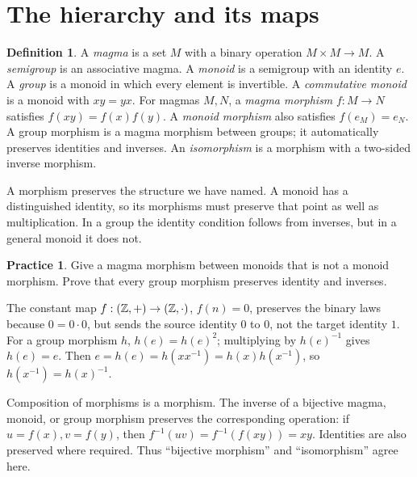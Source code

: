 \documentclass[11pt,openany]{book}
\theoremstyle{definition}
\newtheorem{definition}[theorem]{Definition}
\newtheorem{exercise}[theorem]{Practice}
\begin{document}
\section{The hierarchy and its maps}
\begin{definition}
A \emph{magma} is a set $M$ with a binary operation $M\times M\to M$. A \emph{semigroup} is an associative magma. A \emph{monoid} is a semigroup with an identity $e$. A \emph{group} is a monoid in which every element is invertible. A \emph{commutative monoid} is a monoid with $xy=yx$.
For magmas $M,N$, a \emph{magma morphism} $f:M\to N$ satisfies $f(xy)=f(x)f(y)$. A \emph{monoid morphism} also satisfies $f(e_M)=e_N$. A group morphism is a magma morphism between groups; it automatically preserves identities and inverses. An \emph{isomorphism} is a morphism with a two-sided inverse morphism.
\end{definition}
\begin{intuition}A morphism preserves the structure we have named. A monoid has a distinguished identity, so its morphisms must preserve that point as well as multiplication. In a group the identity condition follows from inverses, but in a general monoid it does not.\end{intuition}
\begin{exercise}Give a magma morphism between monoids that is not a monoid morphism. Prove that every group morphism preserves identity and inverses.\end{exercise}
\begin{solution}The constant map $f:(\mathbb Z,+)\to(\mathbb Z,\cdot)$, $f(n)=0$, preserves the binary laws because $0=0\cdot0$, but sends the source identity $0$ to $0$, not the target identity $1$. For a group morphism $h$, $h(e)=h(e)^2$; multiplying by $h(e)^{-1}$ gives $h(e)=e$. Then $e=h(e)=h(xx^{-1})=h(x)h(x^{-1})$, so $h(x^{-1})=h(x)^{-1}$.\end{solution}
Composition of morphisms is a morphism. The inverse of a bijective magma, monoid, or group morphism preserves the corresponding operation: if $u=f(x),v=f(y)$, then $f^{-1}(uv)=f^{-1}(f(xy))=xy$. Identities are also preserved where required. Thus ``bijective morphism'' and ``isomorphism'' agree here.
\end{document}
